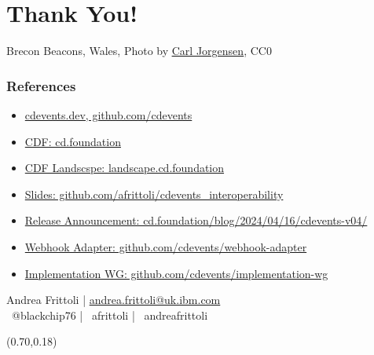 \documentclass[aspectratio=169,11pt,hyperref={colorlinks=true}]{beamer}
\begin{document}
\section[Thank You]{Thank You!}

\begin{sectionwithpiclargecentral}{Brecon Beacons, Wales, Photo by \href{https://unsplash.com/@scamartist}{\underline{Carl Jorgensen}}, CC0}
\end{sectionwithpiclargecentral}

\begin{blackframe}
  \frametitle{References}
  \begin{itemize}
    \item \href{https://cdevents.dev}{cdevents.dev, github.com/cdevents}
    \item \href{https://cd.foundation}{CDF: cd.foundation}
    \item \href{https://landscape.cd.foundation}{CDF Landscspe: landscape.cd.foundation}
    \item \href{https://github.com/afrittoli/cdevents_interoperability}{Slides: github.com/afrittoli/cdevents\_interoperability}
  \end{itemize}
  \vspace{0.02\textheight}
  \begin{itemize}
    \item \href{https://cd.foundation/blog/2024/04/16/cdevents-v04/}{Release Announcement: cd.foundation/blog/2024/04/16/cdevents-v04/}
    \item \href{https://github.com/cdevents/webhook-adapter/}{Webhook Adapter: github.com/cdevents/webhook-adapter}
    \item \href{https://github.com/cdevents/implementation-wg}{Implementation WG: github.com/cdevents/implementation-wg}
  \end{itemize}
  \vspace{0.1\textheight}
  Andrea Frittoli | \href{mailto:andrea.frittoli@uk.ibm.com}{andrea.frittoli@uk.ibm.com} \\
  \faTwitter ~@blackchip76 | \faGithub ~afrittoli | \faLinkedin ~andreafrittoli
  \begin{textblock*}{0.15\paperwidth}(0.70\paperwidth,0.18\paperheight)

\end{textblock*}
\end{blackframe}
\end{document}
